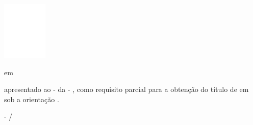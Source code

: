 \begin{center}
	\centerline{\includegraphics[scale=1]{figuras/logo-ufms-cabecalho-em-branco.png}}
	
	\vskip 0.5cm
	
	{\fontsize{14pt}{14pt}\selectfont {\instituicaoTRAB}}
	
	{\fontsize{12pt}{12pt}\selectfont \campusInstituicaoTRAB}
	
	{\fontsize{12pt}{12pt}\selectfont {\grauCursoTRAB } em { \cursoTRAB}}
	
	\vskip 2.5cm
	
	{\fontsize{16pt}{16pt}\selectfont \tituloTRAB}
	
	\vskip 2.5cm
	
	{\fontsize{12pt}{12pt}\selectfont \academicoUmTRAB \break \academicoDoisTRAB \break \academicoTresTRAB}
	
	\vskip 2cm

	\hspace{8.5cm}
	\begin{minipage}{7.5cm}
		\fontsize{11pt}{11pt}\selectfont
		{\denominacaoExtensaTrabalhoTRAB } apresentado ao { \campusInstituicaoTRAB } - {\siglaCampusInstituicaoTRAB } da { \instituicaoTRAB } - { \siglaInstituicaoTRAB}, como requisito parcial para a obtenção do título de { \grauFormacaoTRAB } em { \cursoTRAB } sob a orientação { \preposicaoOrientadorTRAB } { \titulcaoOrientadorTRAB } {\nomeOrientadorTRAB}.
	\end{minipage}%
	\vspace*{\fill}
	
	\vskip 4.28cm
	
	{\fontsize{12pt}{12pt}\selectfont {\cidadeTRAB } - {\siglaEstadoTRAB}}
	\break
	{\fontsize{12pt}{12pt}\selectfont \mesTRAB/\anoTRAB}
	
\end{center}
\clearpage
\thispagestyle{empty}
\newpage

